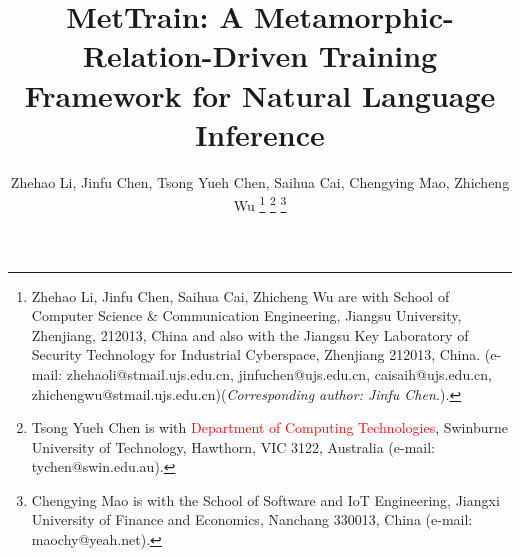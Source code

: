 \documentclass[lettersize,journal]{IEEEtran}
\newcommand{\red}[1]{\textcolor{red}{#1}}
\begin{document}
\title{MetTrain: A Metamorphic-Relation-Driven Training Framework for Natural Language Inference}

\author{Zhehao Li, Jinfu Chen, Tsong Yueh Chen, Saihua Cai, Chengying Mao, Zhicheng Wu
\thanks{Zhehao Li, Jinfu Chen, Saihua Cai, Zhicheng Wu are with School of Computer Science \& Communication Engineering, Jiangsu University, Zhenjiang, 212013, China and also with the Jiangsu Key Laboratory of Security Technology for Industrial Cyberspace, Zhenjiang 212013, China. (e-mail: zhehaoli@stmail.ujs.edu.cn, jinfuchen@ujs.edu.cn, caisaih@ujs.edu.cn, zhichengwu@stmail.ujs.edu.cn)(\textit{Corresponding author: Jinfu Chen.}).}
\thanks{Tsong Yueh Chen is with \red{Department of Computing Technologies}, Swinburne University of Technology, Hawthorn, VIC 3122, Australia (e-mail: tychen@swin.edu.au).}
\thanks{Chengying Mao is with the School of Software and IoT Engineering, Jiangxi University of Finance and Economics, Nanchang 330013, China (e-mail: maochy@yeah.net).}}



\maketitle
\end{document}
